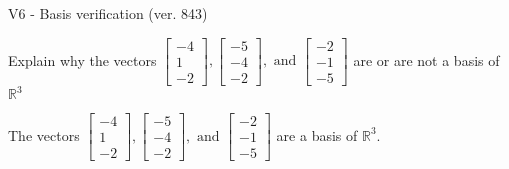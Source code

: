 \begin{exercise}
  \begin{exerciseTitle}V6 - Basis verification (ver. 843)\end{exerciseTitle}
  \begin{exerciseStatement}
    Explain why the vectors \(\left[\begin{array}{r}
-4 \\
1 \\
-2
\end{array}\right] , \left[\begin{array}{r}
-5 \\
-4 \\
-2
\end{array}\right] , \text{ and } \left[\begin{array}{r}
-2 \\
-1 \\
-5
\end{array}\right]\) are or are not a basis of \(\mathbb{R}^3\)	


  \end{exerciseStatement}
  \begin{exerciseAnswer}
   The vectors \(\left[\begin{array}{r}
-4 \\
1 \\
-2
\end{array}\right] , \left[\begin{array}{r}
-5 \\
-4 \\
-2
\end{array}\right] , \text{ and } \left[\begin{array}{r}
-2 \\
-1 \\
-5
\end{array}\right]\) 
  	 are  a basis of \(\mathbb{R}^3\).
  


  \end{exerciseAnswer}
\end{exercise}